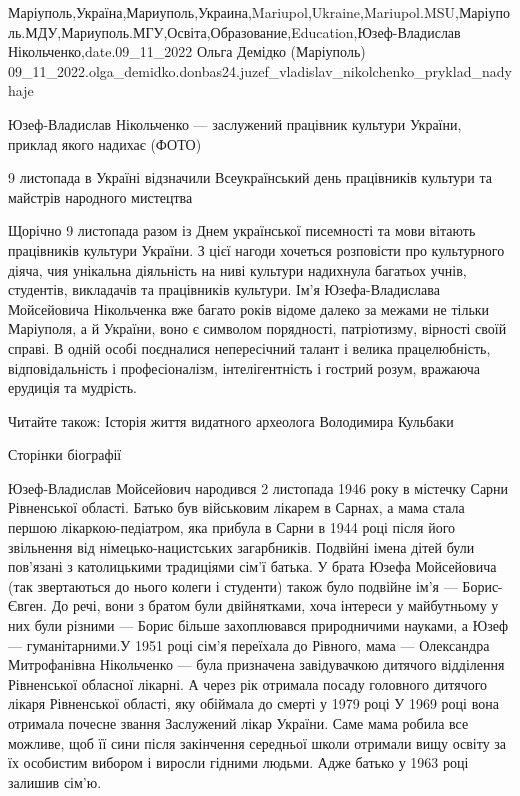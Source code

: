  
 
 
 
 

Маріуполь,Україна,Мариуполь,Украина,Mariupol,Ukraine,Mariupol.MSU,Маріуполь.МДУ,Мариуполь.МГУ,Освіта,Образование,Education,Юзеф-Владислав Нікольченко,date.09_11_2022
Ольга Демідко (Маріуполь)
09_11_2022.olga_demidko.donbas24.juzef_vladislav_nikolchenko_pryklad_nadyhaje

Юзеф-Владислав Нікольченко — заслужений працівник культури України, приклад
якого надихає (ФОТО)

9 листопада в Україні відзначили Всеукраїнський день працівників культури та
майстрів народного мистецтва

Щорічно 9 листопада разом із Днем української писемності та мови вітають
працівників культури України. З цієї нагоди хочеться розповісти про культурного
діяча, чия унікальна діяльність на ниві культури надихнула багатьох учнів,
студентів, викладачів та працівників культури. Ім'я Юзефа-Владислава
Мойсейовича Нікольченка вже багато років відоме далеко за межами не тільки
Маріуполя, а й України, воно є символом порядності, патріотизму, вірності своїй
справі. В одній особі поєдналися непересічний талант і велика працелюбність,
відповідальність і професіоналізм, інтелігентність і гострий розум, вражаюча
ерудиція та мудрість.

Читайте також: Історія життя видатного археолога Володимира Кульбаки

Сторінки біографії

Юзеф-Владислав Мойсейович народився 2 листопада 1946 року в містечку Сарни
Рівненської області. Батько був військовим лікарем в Сарнах, а мама стала
першою лікаркою-педіатром, яка прибула в Сарни в 1944 році після його
звільнення від німецько-нацистських загарбників. Подвійні імена дітей були
пов’язані з католицькими традиціями сім'ї батька. У брата Юзефа Мойсейовича
(так звертаються до нього колеги і студенти) також було подвійне ім'я —
Борис-Євген. До речі, вони з братом були двійнятками, хоча інтереси у
майбутньому у них були різними — Борис більше захоплювався природничими
науками, а Юзеф — гуманітарними.У 1951 році сім'я переїхала до Рівного, мама —
Олександра Митрофанівна Нікольченко — була призначена завідувачкою дитячого
відділення Рівненської обласної лікарні. А через рік отримала посаду головного
дитячого лікаря Рівненської області, яку обіймала до смерті у 1979 році У 1969
році вона отримала почесне звання Заслужений лікар України. Саме мама робила
все можливе, щоб її сини після закінчення середньої школи отримали вищу освіту
за їх особистим вибором і виросли гідними людьми. Адже батько у 1963 році
залишив сім'ю.

